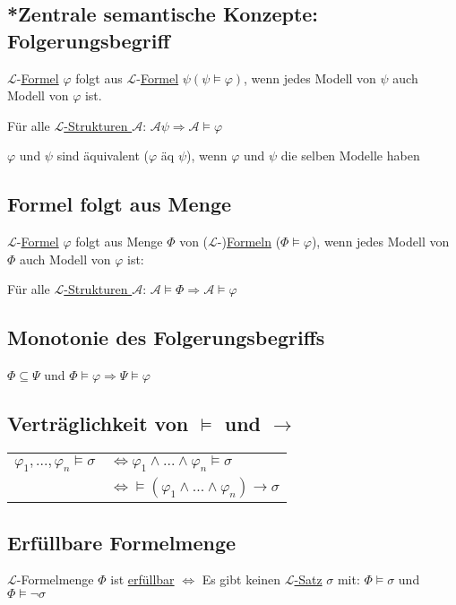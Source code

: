 \documentclass[12pt,a4paper]{article} %
\begin{document}
	\subsection{*Zentrale semantische Konzepte: Folgerungsbegriff}
	$\mathcal{L}$-\hyperref[Formel]{Formel} $\varphi$ folgt aus $\mathcal{L}$-\hyperref[Formel]{Formel} $\psi (\psi \hyperref[Erfullbar]{\vDash} \varphi)$, wenn jedes Modell von $\psi$ auch Modell von $\varphi$ ist.
	
	Für alle \hyperref[Struktur]{$\mathcal{L}$-Strukturen $\mathcal{A}$}: $\mathcal{A} \psi \Rightarrow \mathcal{A} \hyperref[Erfullbar]{\vDash} \varphi$
	
	$\varphi$ und $\psi$ sind äquivalent ($\varphi$ äq $\psi$), wenn $\varphi$ und $\psi$ die selben Modelle haben
	
	\subsection{Formel folgt aus Menge}
	$\mathcal{L}$-\hyperref[Formel]{Formel} $\varphi$ folgt aus Menge $\Phi$ von ($\mathcal{L}$-)\hyperref[Formel]{Formeln} ($\Phi \hyperref[Erfullbar]{\vDash} \varphi$), wenn jedes Modell von $\Phi$ auch Modell von $\varphi$ ist:
	
	Für alle \hyperref[Struktur]{$\mathcal{L}$-Strukturen $\mathcal{A}$}: $\mathcal{A} \hyperref[Erfullbar]{\vDash} \Phi \Rightarrow \mathcal{A} \hyperref[Erfullbar]{\vDash} \varphi$ 
	
	\subsection{Monotonie des Folgerungsbegriffs}
	$\Phi \subseteq \Psi$ und $\Phi \hyperref[Erfullbar]{\vDash} \varphi \Rightarrow \Psi \hyperref[Erfullbar]{\vDash} \varphi$
	
	\subsection{Verträglichkeit von $\vDash$ und $\rightarrow$}
	\begin{tabular}{l l}
		$\varphi_1, ..., \varphi_n \hyperref[Erfullbar]{\vDash} \sigma$ & $\Leftrightarrow \varphi_1 \land ... \land \varphi_n \hyperref[Erfullbar]{\vDash} \sigma$ \\
		& $\Leftrightarrow \hyperref[Erfullbar]{\vDash} (\varphi_1 \land ... \land \varphi_n) \rightarrow \sigma$
	\end{tabular}

	\subsection{Erfüllbare Formelmenge}
	$\mathcal{L}$-Formelmenge $\Phi$ ist \hyperref[Erfullbar]{erfüllbar} $\Leftrightarrow$ Es gibt keinen \hyperref[LSatz]{$\mathcal{L}$-Satz} $\sigma$ mit: $\Phi \hyperref[Erfullbar]{\vDash} \sigma$ und $\Phi \hyperref[Erfullbar]{\vDash} \neg \sigma$
	
\end{document}
